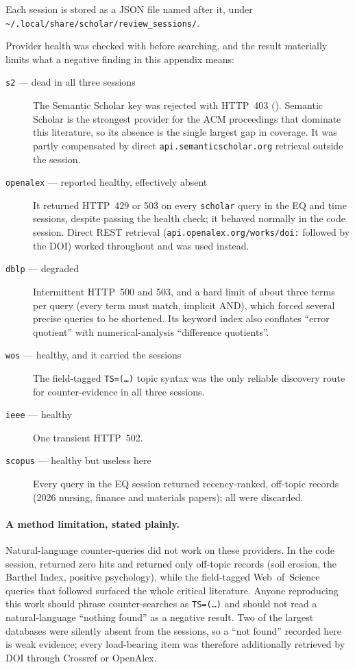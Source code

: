 Each session is stored as a JSON file named after it, under
\nolinkurl{~/.local/share/scholar/review_sessions/}.

Provider health was checked with  before
searching, and the result materially limits what a negative finding in this
appendix means:

\begin{description}
\item[\texttt{s2} --- dead in all three sessions] The Semantic Scholar key
  was rejected with HTTP~403 ().  Semantic Scholar is the strongest provider for
  the ACM proceedings that dominate this literature, so its absence is the
  single largest gap in coverage.  It was partly compensated by direct
  \nolinkurl{api.semanticscholar.org} retrieval outside the session.
\item[\texttt{openalex} --- reported healthy, effectively absent] It
  returned HTTP~429 or 503 on every \texttt{scholar} query in the EQ and
  time sessions, despite passing the health check; it behaved normally in
  the code session.  Direct REST retrieval
  (\nolinkurl{api.openalex.org/works/doi:} followed by the DOI) worked
  throughout
  and was used instead.
\item[\texttt{dblp} --- degraded] Intermittent HTTP~500 and 503, and a hard
  limit of about three terms per query (every term must match, implicit
  AND), which forced several precise queries to be shortened.  Its keyword
  index also conflates \enquote{error quotient} with numerical-analysis
  \enquote{difference quotients}.
\item[\texttt{wos} --- healthy, and it carried the sessions] The field-tagged
  \texttt{TS=(\ldots)} topic syntax was the only reliable discovery route for
  counter-evidence in all three sessions.
\item[\texttt{ieee} --- healthy] One transient HTTP~502.
\item[\texttt{scopus} --- healthy but useless here] Every query in the EQ
  session returned recency-ranked, off-topic records (2026 nursing, finance
  and materials papers); all were discarded.
\end{description}

\paragraph{A method limitation, stated plainly.}
Natural-language counter-queries did not work on these providers.  In the
code session,  returned zero
hits and  returned only
off-topic records (soil erosion, the Barthel Index, positive psychology),
while the field-tagged Web~of~Science queries that followed surfaced the
whole critical literature.  Anyone reproducing this work should phrase
counter-searches as \texttt{TS=(\ldots)} and should not read a
natural-language \enquote{nothing found} as a negative result.  Two of the
largest databases were silently absent from the sessions, so a
\enquote{not found} recorded here is weak evidence; every load-bearing item
was therefore additionally retrieved by DOI through Crossref or OpenAlex.

